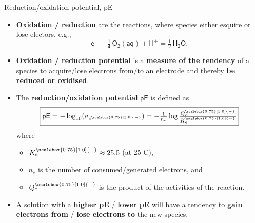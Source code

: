 %
%
\begin{frame}{Reduction/oxidation potential, pE}
\begin{itemize}
	\item  \alert{\textbf{Oxidation / reduction}} are the reactions, where species either esquire or lose electors, e.g., 
	\[
	\mathsf{e^- + \tfrac{1}{4} \, O_2(aq) + H^+ = \tfrac{1}{2} \, H_2O.}
	\]
\item \alert{\textbf{Oxidation / reduction potential}} is a {\bf measure of the tendency} of a species to acquire/lose electrons from/to an electrode and thereby {\bf be reduced or oxidised}. 
%
\item The \alert{\textbf{reduction/oxidation potential}} $\mathsf{pE}$ is defined as
%
\[
\boxed{ \mathsf{pE} = - \log_{10} (a_{e^{\scalebox{0.75}[1.0]{-}}}) = -\tfrac{1}{n_e} \log \tfrac{Q^{\scalebox{0.75}[1.0]{-}}_e}{K^{\scalebox{0.75}[1.0]{-}}_e} }
\]
\vskip -5pt
%
where 
\begin{itemize}
	\item $K^{\scalebox{0.75}[1.0]{-}}_e \approx 25.5$ (at 25 \textdegree C), 
	\item $n_e$ is the number of consumed/generated electrons, and 
	\item $Q^{\scalebox{0.75}[1.0]{-}}_e$ is the product of the activities of the reaction. 
\end{itemize}
%
\item A solution with a {\bf higher pE} /  {\bf lower pE} will have a tendency to {\bf gain electrons from} / {\bf lose electrons to} the new species.
%
\end{itemize}

\end{frame}
%
%
